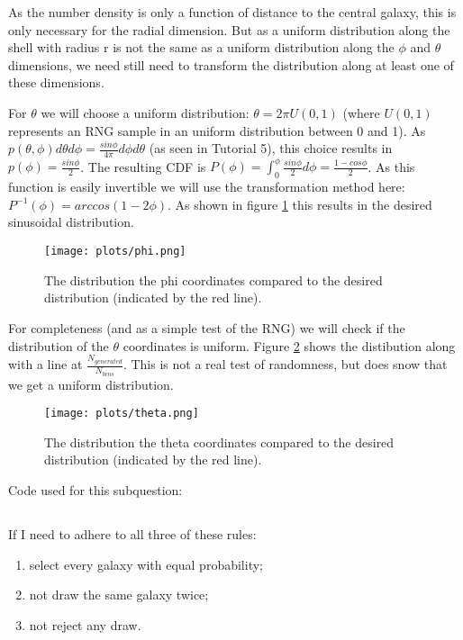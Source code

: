 As the number density is only a function of distance to the central galaxy, this is only necessary for the radial dimension.
But as a uniform distribution along the shell with radius r is not the same as a uniform distribution along the $\phi$ and $\theta$ dimensions, we need still need 
to transform the distribution along at least one of these dimensions.

For $\theta$ we will choose a uniform distribution: $\theta = 2 \pi U(0,1)$ (where $U(0,1)$ represents an RNG sample in an uniform distribution between 0 and 1).
As $p(\theta,\phi)d\theta d\phi = \frac{sin \phi}{4 \pi} d\phi d\theta$ (as seen in Tutorial 5),
this choice results in $p(\phi) = \frac{sin \phi}{2}$.
The resulting CDF is $P(\phi) = \int_0^{\phi} \frac{sin \phi}{2} d\phi = \frac{1-cos \phi}{2}$.
As this function is easily invertible we will use the transformation method here:
$P^{-1}(\phi) = arccos(1-2\phi)$.
As shown in figure \ref{fig:phi} this results in the desired sinusoidal distribution.
\begin{figure}[h]
    \centering
    \texttt{[image: plots/phi.png]}
    \caption{The distribution the phi coordinates compared to the desired distribution (indicated by the red line).}
    \label{fig:phi}
\end{figure}

For completeness (and as a simple test of the RNG) we will check if the distribution of the $\theta$ coordinates is uniform.
Figure \ref{fig:theta} shows the distibution along with a line at $\frac{N_{generated}}{N_{bins}}$.
This is not a real test of randomness, but does snow that we get a uniform distribution.
\begin{figure}[h]
    \centering
    \texttt{[image: plots/theta.png]}
    \caption{The distribution the theta coordinates compared to the desired distribution (indicated by the red line).}
    \label{fig:theta}
\end{figure}

Code used for this subquestion:


\subsection{}
If I need to adhere to all three of these rules:

\begin{enumerate}
    \item select every galaxy with equal probability;
    \item not draw the same galaxy twice;
    \item not reject any draw.
\end{enumerate}

